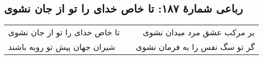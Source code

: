 \begin{center}
\section*{رباعی شمارهٔ ۱۸۷: تا خاص خدای را تو از جان نشوی}
\label{sec:187}
\begin{longtable}{l p{0.5cm} r}
تا خاص خدای را تو از جان نشوی
&&
بر مرکب عشق مرد میدان نشوی
\\
شیران جهان پیش تو روبه باشند
&&
گر تو سگ نفس را به فرمان نشوی
\\
\end{longtable}
\end{center}
